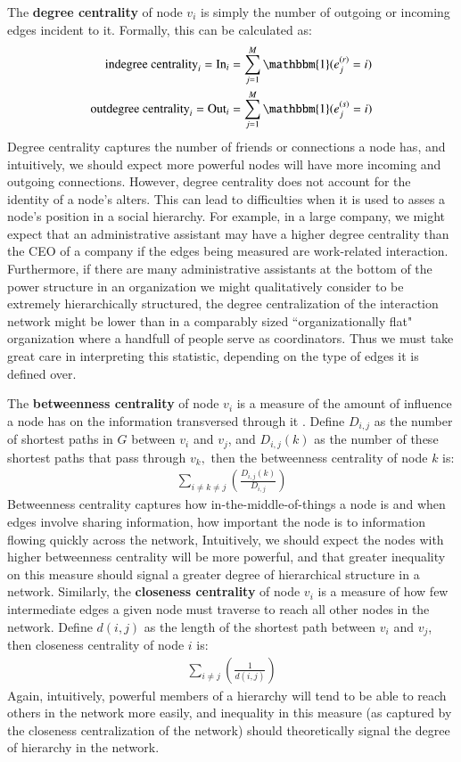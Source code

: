 \documentclass[3p,times]{elsarticle}
\begin{document}
The \textbf{degree centrality} of node $v_{i}$ is simply the number of outgoing or incoming edges incident to it. Formally, this can be calculated as:
\begin{align}
	\text{indegree centrality}_i = \text{In}_i&= \sum_{j=1}^M \mathbbm{1}(e_j^{(r)} = i) \\
	\text{outdegree centrality}_i  = \text{Out}_i &= \sum_{j=1}^M \mathbbm{1}(e_j^{(s)} = i) 
\end{align}
Degree centrality captures the number of friends or connections a node has, and intuitively, we should expect more powerful nodes will have more incoming and outgoing connections. However, degree centrality does not account for the identity of a node's alters. This can lead to difficulties when it is used to asses a node's position in a social hierarchy. For example, in a large company, we might expect that an administrative assistant may have a higher degree centrality than the CEO of a company if the edges being measured are work-related interaction. Furthermore, if there are many administrative assistants at the bottom of the power structure in an organization we might qualitatively consider to be extremely hierarchically structured, the degree centralization of the interaction network might be lower than in a comparably sized ``organizationally flat" organization where a handfull of people serve as coordinators. Thus we must take great care in interpreting this statistic, depending on the type of edges it is defined over. 


The \textbf{betweenness centrality} of node $v_{i}$ is a measure of the amount of influence a node has on the information transversed through it \cite{between}. Define $D_{i,j}$ as the number of shortest paths in $G$ between $v_{i}$ and $v_{j}$, and $D_{i,j}(k)$ as the number of these shortest paths that pass through $v_{k},$ then the betweenness centrality of node $k$ is:
\begin{align}
	\sum_{i\neq k\neq j}{(\frac{D_{i,j}(k)}{D_{i,j}})}
\end{align}
Betweenness centrality captures how in-the-middle-of-things a node is and when edges involve sharing information, how important the node is to information flowing quickly across the network, Intuitively, we should expect the nodes with higher betweenness centrality will be more powerful, and that greater inequality on this measure should signal a greater degree of hierarchical structure in a network. Similarly, the \textbf{closeness centrality} of node $v_{i}$ is a measure of how few intermediate edges a given node must traverse to reach all other nodes in the network. Define $d(i,j)$ as the length of the shortest path between $v_{i}$ and $v_{j}$, then closeness centrality of node $i$ is: 
\begin{align}
	\sum_{i\neq j}{(\frac{1}{d(i,j)})}
\end{align}
Again, intuitively, powerful members of a hierarchy will tend to be able to reach others in the network more easily, and inequality in this measure (as captured by the closeness centralization of the network) should theoretically signal the degree of hierarchy in the network.
\end{document}
